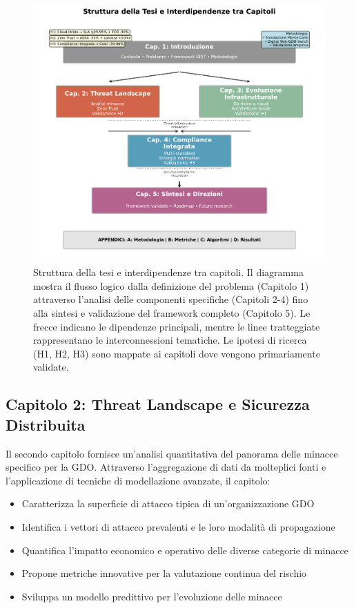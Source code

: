 \begin{figure}[htbp]
\centering
\includegraphics[width=\textwidth]{thesis_figures/cap1/fig_1_4_thesis_structure.pdf}
\caption{Struttura della tesi e interdipendenze tra capitoli. Il diagramma mostra il flusso logico dalla definizione del problema (Capitolo 1) attraverso l'analisi delle componenti specifiche (Capitoli 2-4) fino alla sintesi e validazione del framework completo (Capitolo 5). Le frecce indicano le dipendenze principali, mentre le linee tratteggiate rappresentano le interconnessioni tematiche. Le ipotesi di ricerca (H1, H2, H3) sono mappate ai capitoli dove vengono primariamente validate.}
\label{fig:thesis_structure}
\end{figure}

\subsection{Capitolo 2: Threat Landscape e Sicurezza Distribuita}

Il secondo capitolo fornisce un'analisi quantitativa del panorama delle minacce specifico per la GDO. Attraverso l'aggregazione di dati da molteplici fonti e l'applicazione di tecniche di modellazione avanzate, il capitolo:
\begin{itemize}
\item Caratterizza la superficie di attacco tipica di un'organizzazione GDO
\item Identifica i vettori di attacco prevalenti e le loro modalità di propagazione
\item Quantifica l'impatto economico e operativo delle diverse categorie di minacce
\item Propone metriche innovative per la valutazione continua del rischio
\item Sviluppa un modello predittivo per l'evoluzione delle minacce
\end{itemize}

